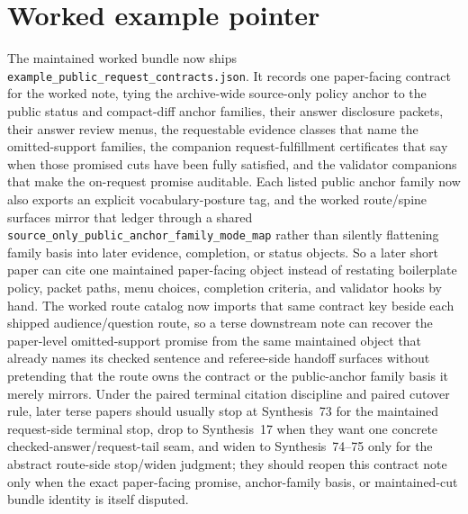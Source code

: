 \documentclass[11pt]{article}
\begin{document}
\section{Worked example pointer}
The maintained worked bundle now ships \nolinkurl{example_public_request_contracts.json}.\cite{series:workedexample}
It records one paper-facing contract for the worked note, tying the archive-wide source-only policy anchor to the public status and compact-diff anchor families, their answer disclosure packets, their answer review menus, the requestable evidence classes that name the omitted-support families, the companion request-fulfillment certificates that say when those promised cuts have been fully satisfied, and the validator companions that make the on-request promise auditable. Each listed public anchor family now also exports an explicit vocabulary-posture tag, and the worked route/spine surfaces mirror that ledger through a shared \nolinkurl{source_only_public_anchor_family_mode_map} rather than silently flattening family basis into later evidence, completion, or status objects.\cite{series:requestfulfillmentcertificates}
So a later short paper can cite one maintained paper-facing object instead of restating boilerplate policy, packet paths, menu choices, completion criteria, and validator hooks by hand. The worked route catalog now imports that same contract key beside each shipped audience/question route, so a terse downstream note can recover the paper-level omitted-support promise from the same maintained object that already names its checked sentence and referee-side handoff surfaces without pretending that the route owns the contract or the public-anchor family basis it merely mirrors. Under the paired terminal citation discipline and paired cutover rule, later terse papers should usually stop at Synthesis~73 for the maintained request-side terminal stop, drop to Synthesis~17 when they want one concrete checked-answer/request-tail seam, and widen to Synthesis~74--75 only for the abstract route-side stop/widen judgment; they should reopen this contract note only when the exact paper-facing promise, anchor-family basis, or maintained-cut bundle identity is itself disputed.\cite{series:requestsideterminalcitationnormalform,series:pairedterminalcitationdiscipline,series:pairedterminalcutoverrules}
\end{document}
